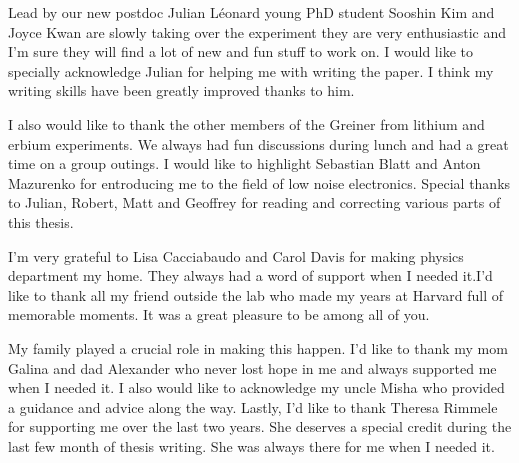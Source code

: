 Lead by our new postdoc Julian L\'eonard young PhD student Sooshin Kim and Joyce Kwan are slowly taking over the experiment they are very enthusiastic and I'm sure they will find a lot of new and fun stuff to work on. I would like to specially acknowledge Julian for helping me with writing the paper. I think my writing skills have been greatly improved thanks to him. 

I also would like to thank the other members of the Greiner from lithium and erbium experiments. We always had fun discussions during lunch and had a great time on a group outings. I would like to highlight Sebastian Blatt and Anton Mazurenko for entroducing me to the field of low noise electronics. Special thanks to Julian, Robert, Matt and Geoffrey for reading and correcting various parts of this thesis.

I'm very grateful to Lisa Cacciabaudo and Carol Davis for making physics department my home. They always had a word of support when I needed it.I'd like to thank all my friend outside the lab who made my years at Harvard full of memorable moments. It was a great pleasure to be among all of you.

My family played a crucial role in making this happen. I'd like to thank my mom Galina and dad Alexander who never lost hope in me and always supported me when I needed it. I also would like to acknowledge my uncle Misha who provided a guidance and advice along the way. Lastly, I'd like to thank Theresa Rimmele for supporting me over the last two years. She deserves a special credit during the last few month of thesis writing. She was always there for me when I needed it.
